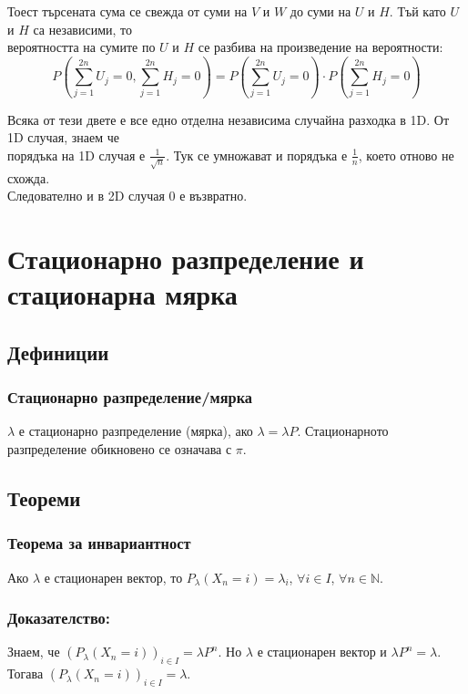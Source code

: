 \documentclass{article}
\begin{document}
Тоест търсената сума се свежда от суми на $V$ и $W$ до суми на $U$ и $H$. Тъй като $U$ и $H$ са независими, то \\
вероятността на сумите по $U$ и $H$ се разбива на произведение на вероятности:
$$P\left(\sum_{j=1}^{2n} U_j = 0, \sum_{j=1}^{2n} H_j = 0\right) = P\left(\sum_{j=1}^{2n} U_j = 0\right) \cdot P\left(\sum_{j=1}^{2n} H_j = 0\right)$$

Всяка от тези двете е все едно отделна независима случайна разходка в 1D. От 1D случая, знаем че \\
порядъка на 1D случая е $\frac{1}{\sqrt{n}}$. Тук се умножават и порядъка е $\frac{1}{n}$, което отново не схожда. \\

Следователно и в 2D случая 0 е възвратно.

\section{Стационарно разпределение и стационарна мярка}

\subsection{Дефиниции}
\subsubsection*{Стационарно разпределение/мярка}
$\lambda$ е стационарно разпределение (мярка), ако $\lambda = \lambda P$. Стационарното разпределение обикновено се означава с $\pi$.

\subsection{Теореми}
\subsubsection*{Теорема за инвариантност}
Ако $\lambda$ е стационарен вектор, то $P_\lambda(X_n = i) = \lambda_i$, $\forall i \in I$, $\forall n \in \mathbb{N}$.

\subsubsection*{Доказателство:}
Знаем, че $(P_\lambda(X_n = i))_{i \in I} = \lambda P^n$. Но $\lambda$ е стационарен вектор и $\lambda P^n = \lambda$. Тогава $(P_\lambda(X_n = i))_{i \in I} = \lambda$.
\end{document}
